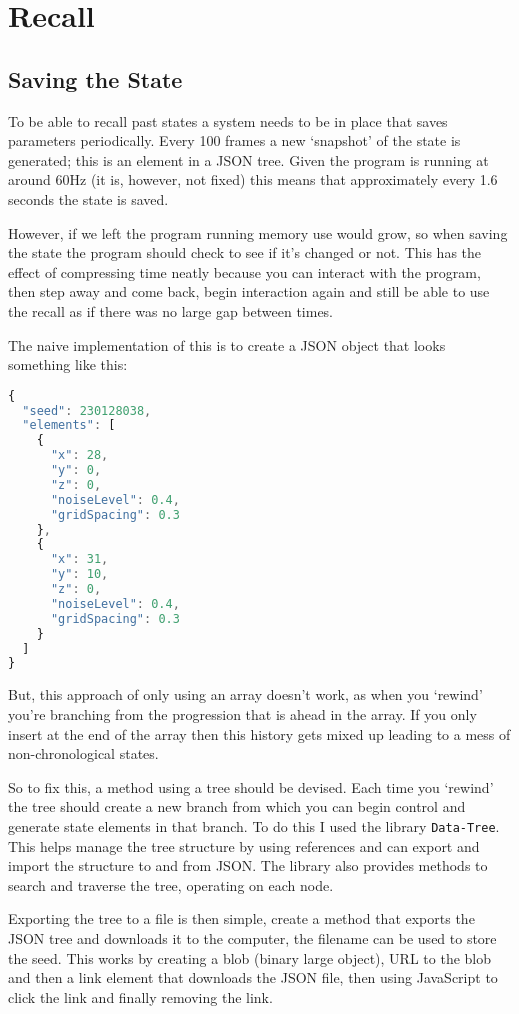 \chapter{Recall}
\section{Saving the State}
To be able to recall past states a system needs to be in place that saves
parameters periodically. Every 100 frames a new `snapshot' of the state is
generated; this is an element in a JSON tree. Given the program is running at
around 60Hz (it is, however, not fixed) this means that approximately every 1.6
seconds the state is saved.

However, if we left the program running memory use would grow, so when saving
the state the program should check to see if it's changed or not. This has the
effect of compressing time neatly because you can interact with the program,
then step away and come back, begin interaction again and still be able to use
the recall as if there was no large gap between times.

The naive implementation of this is to create a JSON object that looks something
like this:

\begin{lstlisting}[language=javascript]
{
  "seed": 230128038,
  "elements": [
    {
      "x": 28,
      "y": 0,
      "z": 0,
      "noiseLevel": 0.4,
      "gridSpacing": 0.3
    },
    {
      "x": 31,
      "y": 10,
      "z": 0,
      "noiseLevel": 0.4,
      "gridSpacing": 0.3
    }
  ]
}
\end{lstlisting}

But, this approach of only using an array doesn't work, as when you `rewind'
you're branching from the progression that is ahead in the array. If
you only insert at the end of the array then this history gets mixed up leading
to a mess of non-chronological states.

So to fix this, a method using a tree should be devised. Each time you `rewind'
the tree should create a new branch from which you can begin control and
generate state elements in that branch. To do this I used the library 
\verb|Data-Tree|. This helps manage the tree structure by using references and
can export and import the structure to and from JSON. The library also provides
methods to search and traverse the tree, operating on each node.

Exporting the tree to a file is then simple, create a method that exports the
JSON tree and downloads it to the computer, the filename can be used to store
the seed. This works by creating a blob (binary large object), URL to the blob
and then a link element that downloads the JSON file, then using JavaScript to
click the link and finally removing the link.


